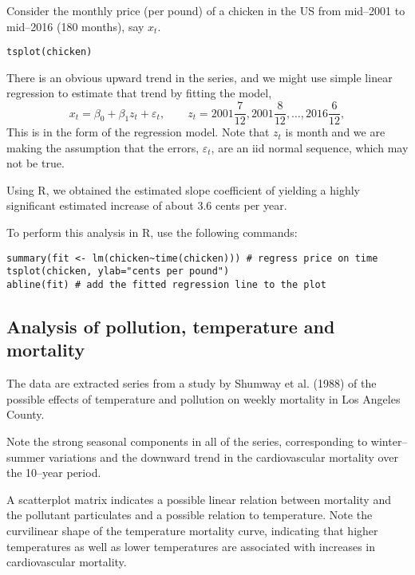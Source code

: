 \documentclass[
paper=128mm:96mm, %
fontsize=9.5pt, %
pagesize, %
parskip=half-, %
]{scrartcl} %
\theoremstyle{mythmstyle} %
\begin{document}
Consider the monthly price (per pound) of a chicken in the US from mid--2001 to mid--2016 (180 months), say $x_t$. 
%
\begin{lstlisting}[belowskip=-0.8 \baselineskip]
tsplot(chicken)
\end{lstlisting}
%
There is an obvious upward trend in the series, and we might use simple linear regression to estimate that trend by fitting the model,
%
\begin{equation}
x_t=\beta_0+\beta_1z_t+\varepsilon_t,\qquad z_t=2001\frac{7}{12},2001\frac{8}{12},\dots,2016\frac{6}{12},
\end{equation}
%
This is in the form of the regression model. Note that $z_t$ is month and we are making the assumption that the errors, $\varepsilon_t$, are an iid normal sequence, which may not be true.
\clearpage

Using R, we obtained the estimated slope coefficient of yielding a highly significant estimated increase of about $3.6$ cents per year. 

To perform this analysis in R, use the following commands:
%
\begin{lstlisting}[belowskip=-0.8 \baselineskip]
summary(fit <- lm(chicken~time(chicken))) # regress price on time 
tsplot(chicken, ylab="cents per pound")
abline(fit) # add the fitted regression line to the plot
\end{lstlisting}
%
\clearpage



\subsection{Analysis of pollution, temperature and mortality}

The data are extracted series from a study by Shumway et al. (1988) of the possible effects of temperature and pollution on weekly mortality in Los Angeles County. 

Note the strong seasonal components in all of the series, corresponding to winter--summer variations and the downward trend in the cardiovascular mortality over the 10--year period.

A scatterplot matrix indicates a possible linear relation between mortality and the pollutant particulates and a possible relation to temperature. Note the curvilinear shape of the temperature mortality curve, indicating that higher temperatures as well as lower temperatures are associated with increases in cardiovascular mortality.
\end{document}
